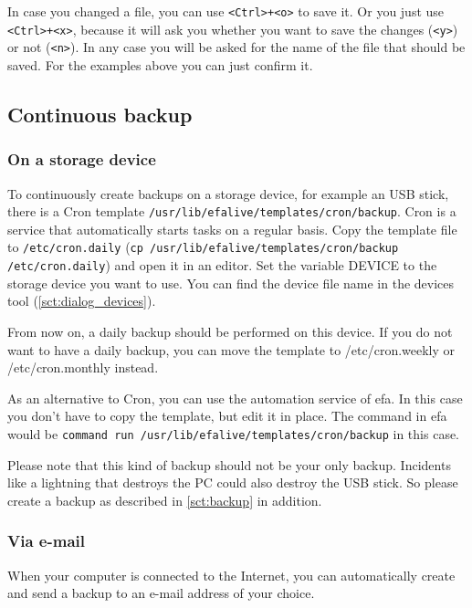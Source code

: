 \documentclass[a4paper,12pt,twoside]{article}
\begin{document}
In case you changed a file, you can use
\texttt{{\textless}Ctrl{\textgreater}+{\textless}o{\textgreater}} to save it. Or
you just use \texttt{{\textless}Ctrl{\textgreater}+{\textless}x{\textgreater}},
because it will ask you whether you want to save the changes
(\texttt{{\textless}y{\textgreater}}) or not (\texttt{{\textless}n{\textgreater}}). In
any case you will be asked for the name of the file that should be
saved. For the examples above you can just confirm it.


\subsection{Continuous backup}
\label{sct:cont_backup}
\subsubsection{On a storage device}
\label{sct:cont_device}
To continuously create backups on a
storage device, for example an USB stick, there is a Cron template
\texttt{/usr/lib/efalive/templates/cron/backup}. Cron is a service that
automatically starts tasks on a regular basis. Copy the template file
to \texttt{/etc/cron.daily} (\texttt{cp /usr/lib/efalive/templates/cron/backup
/etc/cron.daily}) and open it in an editor. Set the variable DEVICE to
the storage device you want to use. You can find the device file name
in the devices tool (\ref{sct:dialog_devices}). 

From now on, a daily backup should be performed on this device. If you
do not want to have a daily backup, you can move the template to
/etc/cron.weekly or /etc/cron.monthly instead.

As an alternative to Cron, you can use the automation service of efa. In
this case you don't have to copy the template, but
edit it in place. The command in efa would be \texttt{command
run /usr/lib/efalive/templates/cron/backup} in this case.

Please note that this kind of backup should not be your only backup.
Incidents like a lightning that destroys the PC could also destroy the
USB stick. So please create a backup as described in \ref{sct:backup} in addition.

\subsubsection{Via e-mail}
\label{sct:cont_mail}
When your computer is connected to the Internet, you can automatically
create and send a backup to an e-mail address of your choice.
\end{document}
